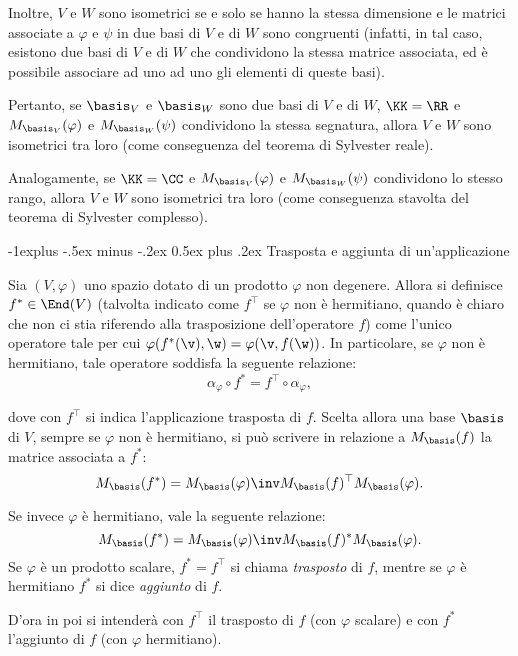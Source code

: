 \documentclass[10pt,landscape]{article}
\makeatletter
\renewcommand{\subsection}{\@startsection{subsection}{2}{0mm}%
	{-1explus -.5ex minus -.2ex}%
	{0.5ex plus .2ex}%
	{\normalfont\normalsize\bfseries}}
\makeatother
\begin{document}
\begin{multicols}{3}
		Inoltre, $V$ e $W$ sono isometrici se e solo se hanno la stessa dimensione e le matrici associate
		a $\varphi$ e $\psi$ in due basi di $V$ e di $W$ sono congruenti (infatti, in tal caso, esistono due
		basi di $V$ e di $W$ che condividono la stessa matrice associata, ed è possibile associare ad uno
		ad uno gli elementi di queste basi).
		
		Pertanto, se $\basis_V$ e $\basis_W$ sono due basi di $V$ e di $W$, $\KK = \RR$ e $M_{\basis_V}(\varphi)$ e $M_{\basis_W}(\psi)$ condividono la stessa segnatura, allora $V$ e $W$ sono
		isometrici tra loro (come conseguenza del teorema di Sylvester reale).
		
		Analogamente, se $\KK = \CC$ e $M_{\basis_V}(\varphi)$ e $M_{\basis_W}(\psi)$ condividono lo stesso
		rango, allora $V$ e $W$ sono isometrici tra loro (come conseguenza stavolta del teorema di Sylvester
		complesso).
		
		\subsection{Trasposta e aggiunta di un'applicazione}

		Sia $(V, \varphi)$ uno spazio dotato di un prodotto $\varphi$ non degenere. Allora si definisce $f^* \in \End(V)$ (talvolta indicato come $f^\top$ se $\varphi$ non è hermitiano, quando è chiaro che non ci stia riferendo alla trasposizione dell'operatore $f$)
		come l'unico operatore tale per cui $\varphi(f^*(\v), \w) = \varphi(\v, f(\w))$.
		In particolare, se $\varphi$ non è hermitiano, tale operatore soddisfa la seguente relazione:
		\[ \alpha_\varphi \circ f^* = f^\top \circ \alpha_\varphi, \]
		
		dove con $f^\top$ si indica l'applicazione trasposta di $f$. Scelta allora una
		base $\basis$ di $V$, sempre se $\varphi$ non è hermitiano, si può scrivere in relazione a $M_\basis(f)$ la
		matrice associata a $f^*$:
		\[ M_\basis(f^*) = M_\basis(\varphi)\inv M_\basis(f)^\top M_\basis(\varphi). \]
		
		Se invece $\varphi$ è hermitiano, vale la seguente relazione:
		\[ M_\basis(f^*) = M_\basis(\varphi)\inv M_\basis(f)^* M_\basis(\varphi). \]
		Se $\varphi$ è un prodotto scalare, $f^* = f^\top$ si chiama \textit{trasposto}
		di $f$, mentre se $\varphi$ è hermitiano $f^*$ si dice \textit{aggiunto} di $f$.

		D'ora in poi si intenderà con $f^\top$ il trasposto di $f$ (con $\varphi$ scalare) e con $f^*$ l'aggiunto di $f$ (con $\varphi$ hermitiano). \\ \vskip 0.05in
		

\end{multicols}
\end{document}
